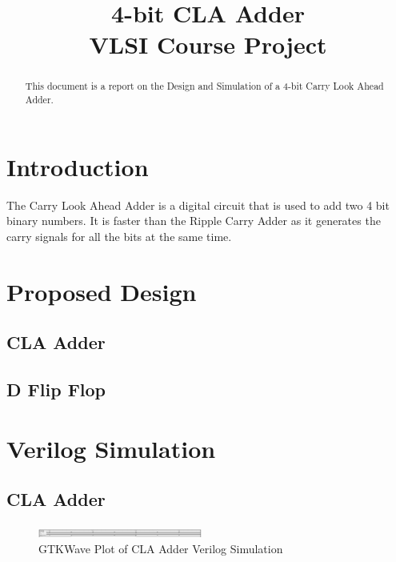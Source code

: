 \documentclass[conference]{IEEEtran}
\begin{document}
\title{4-bit CLA Adder \\ VLSI Course Project}

\author{
}

\maketitle

\begin{abstract}
This document is a report on the Design and Simulation of a 4-bit Carry Look Ahead Adder.
\end{abstract}


\section{Introduction}
The Carry Look Ahead Adder is a digital circuit that is used to add two 4 bit binary numbers. It is faster than the Ripple Carry Adder as it generates the carry signals for all the bits at the same time. 

\section{Proposed Design}

\subsection{CLA Adder}

\subsection{D Flip Flop}

\section{Verilog Simulation}

\subsection{CLA Adder}

\begin{figure}[H]
    \centering
    \includegraphics[width=0.48\textwidth]{images/verilog_cla.png}
    \caption{GTKWave Plot of CLA Adder Verilog Simulation}
\end{figure}
\end{document}

